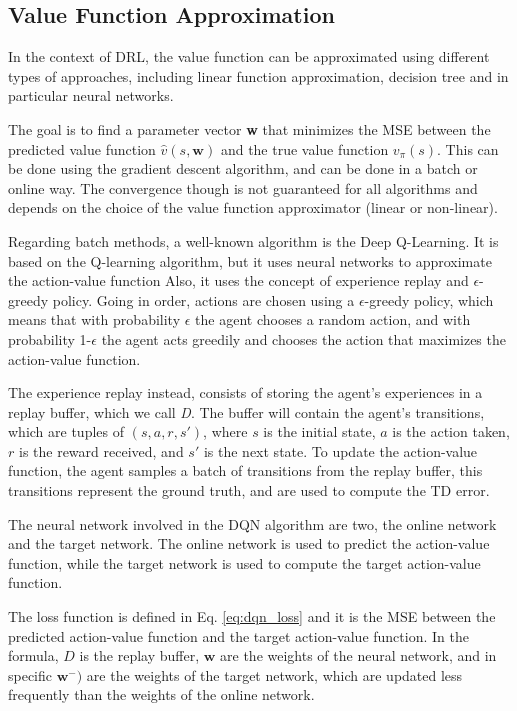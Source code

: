 \subsection{Value Function Approximation}\label{subsec:value-function-approximation}
In the context of DRL, the value function can be approximated using different types of approaches, including linear function approximation, decision tree and in particular neural networks.

The goal is to find a parameter vector \textbf{w} that minimizes the MSE between the predicted value function $\hat{v}(s,\textbf{w})$ and the true value function $v_\pi(s)$.
This can be done using the gradient descent algorithm, and can be done in a batch or online way.
The convergence though is not guaranteed for all algorithms and depends on the choice of the value function approximator (linear or non-linear).

Regarding batch methods, a well-known algorithm is the Deep Q-Learning.
It is based on the Q-learning algorithm, but it uses neural networks to approximate the action-value function
Also, it uses the concept of experience replay and $\epsilon$-greedy policy.
Going in order, actions are chosen using a $\epsilon$-greedy policy, which means that with probability $\epsilon$ the agent chooses a random action, and with probability 1-$\epsilon$ the agent acts greedily and chooses the action that maximizes the action-value function.

The experience replay instead, consists of storing the agent's experiences in a replay buffer, which we call \textit{D}.
The buffer will contain the agent's transitions, which are tuples of $(s, a, r, s')$, where $s$ is the initial state, $a$ is the action taken, $r$ is the reward received, and $s'$ is the next state.
To update the action-value function, the agent samples a batch of transitions from the replay buffer, this transitions represent the ground truth, and are used to compute the TD error. %

The neural network involved in the DQN algorithm are two, the online network and the target network.
The online network is used to predict the action-value function, while the target network is used to compute the target action-value function.

The loss function is defined in Eq. \ref{eq:dqn_loss} and it is the MSE between the predicted action-value function and the target action-value function.
In the formula, $D$ is the replay buffer, $\textbf{w}$ are the weights of the neural network, and in specific $\textbf{w}^-)$ are the weights of the target network, which are updated less frequently than the weights of the online network.


